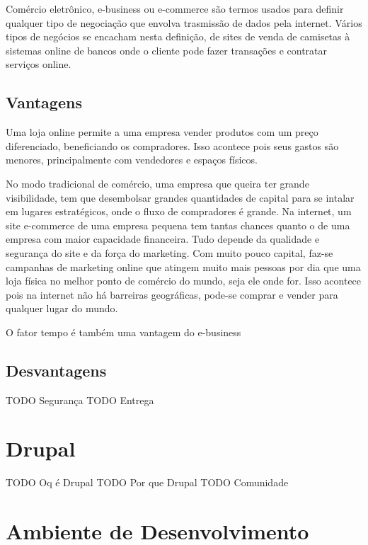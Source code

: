 Comércio eletrônico, e-business ou e-commerce são termos usados para definir qualquer tipo de negociação que envolva trasmissão de dados pela internet\cite{WhatIsEcommerce}. Vários tipos de negócios se encacham nesta definição, de sites de venda de camisetas à sistemas online de bancos onde o cliente pode fazer transações e contratar serviços online.

\subsection{Vantagens}

Uma loja online permite a uma empresa vender produtos com um preço diferenciado, beneficiando os compradores. Isso acontece pois seus gastos são menores, principalmente com vendedores e espaços físicos.

No modo tradicional de comércio, uma empresa que queira ter grande visibilidade, tem que desembolsar grandes quantidades de capital para se intalar em lugares estratégicos, onde o fluxo de compradores é grande. Na internet, um site e-commerce de uma empresa pequena tem tantas chances quanto o de uma empresa com maior capacidade financeira. Tudo depende da qualidade e segurança do site e da força do marketing. Com muito pouco capital, faz-se campanhas de marketing online que atingem muito mais pessoas por dia que uma loja física no melhor ponto de comércio do mundo, seja ele onde for. Isso acontece pois na internet não há barreiras geográficas, pode-se comprar e vender para qualquer lugar do mundo.

O fator tempo é também uma vantagem do e-business

\subsection{Desvantagens}

TODO Segurança
TODO Entrega

\section{Drupal}

TODO Oq é Drupal
TODO Por que Drupal
TODO Comunidade

\section{Ambiente de Desenvolvimento}

